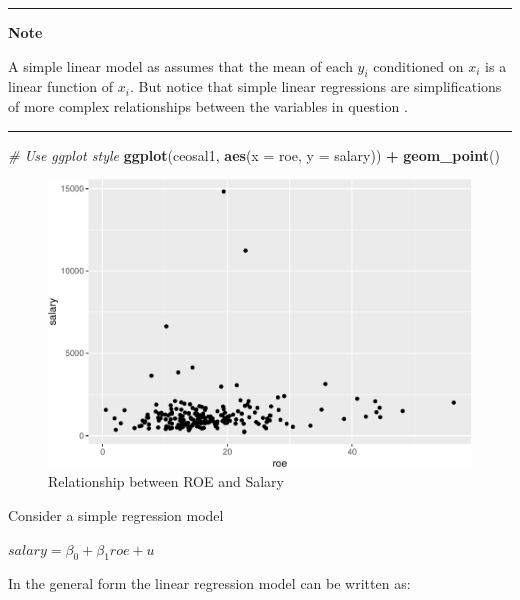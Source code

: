 \documentclass[]{book}
\newenvironment{Shaded}{\begin{snugshade}}{\end{snugshade}}
\newcommand{\CommentTok}[1]{\textcolor[rgb]{0.56,0.35,0.01}{\textit{#1}}}
\newcommand{\DataTypeTok}[1]{\textcolor[rgb]{0.13,0.29,0.53}{#1}}
\newcommand{\KeywordTok}[1]{\textcolor[rgb]{0.13,0.29,0.53}{\textbf{#1}}}
\newcommand{\NormalTok}[1]{#1}
\newcommand{\OperatorTok}[1]{\textcolor[rgb]{0.81,0.36,0.00}{\textbf{#1}}}
\newcommand{\StringTok}[1]{\textcolor[rgb]{0.31,0.60,0.02}{#1}}
\begin{document}
\begin{center}\rule{0.5\linewidth}{\linethickness}\end{center}

\textbf{Note}

A simple linear model as assumes that the mean of each \(y_{i}\)
conditioned on \(x_{i}\) is a linear function of \(x_{i}\). But notice
that simple linear regressions are simplifications of more complex
relationships between the variables in question \citet{dalpiaz2016}.

\begin{center}\rule{0.5\linewidth}{\linethickness}\end{center}

\begin{Shaded}
\begin{Highlighting}[]
\CommentTok{# Use ggplot style}
\KeywordTok{ggplot}\NormalTok{(ceosal1, }\KeywordTok{aes}\NormalTok{(}\DataTypeTok{x =}\NormalTok{ roe, }\DataTypeTok{y =}\NormalTok{ salary)) }\OperatorTok{+}
\StringTok{  }\KeywordTok{geom_point}\NormalTok{()}
\end{Highlighting}
\end{Shaded}

\begin{figure}
\centering
\includegraphics{MEM5220_R_files/figure-latex/ceosal1-1.pdf}
\caption{\label{fig:ceosal1}Relationship between ROE and Salary}
\end{figure}

Consider a simple regression model

\(salary = \beta_0 + \beta_1roe + u\)

In the general form the linear regression model can be written as:
\end{document}
